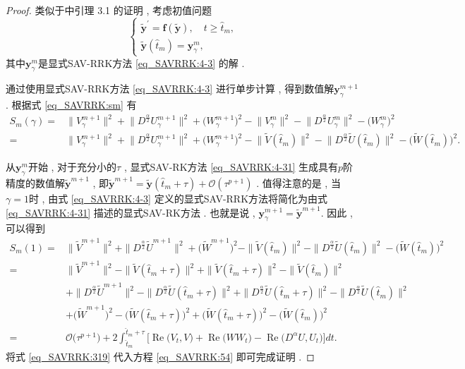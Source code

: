 \begin{proof}
类似于\citep{liImplicitexplicitRelaxationRungeKutta2022}中引理 3.1 的证明 , 
考虑初值问题
\begin{equation}
\left\{\begin{array}{l}
\tilde{\bm{y}}^{\prime}=\bm{f}(\tilde{\bm{y}}) , \quad t \geq \hat{t}_m , \\
\tilde{\bm{y}}\left(\hat{t}_m\right)=\bm{y}_\gamma^m , 
\end{array}\right . 
\end{equation}
其中$\bm{y}_\gamma^m$是显式SAV-RRK方法 \eqref{eq_SAVRRK:4-3} 的解 . 

通过使用显式SAV-RRK方法 \eqref{eq_SAVRRK:4-3} 进行单步计算 , 得到数值解$\bm{y}_\gamma^{m+1}$ . 根据式 \eqref{eq_SAVRRK:sm} 有
\begin{equation}
\begin{aligned}
S_m(\gamma) \!=& \|V_\gamma^{m+1}\|^2 \!+\! \|D^\frac{\alpha}{2} U_\gamma^{m+1}\|^2\!+\!\big(W_\gamma^{m+1}\big)^2\!-\!\|V_\gamma^{m}\|^2 \!-\! \|D^\frac{\alpha}{2} U_\gamma^{m}\|^2\!-\!\big(W_\gamma^{m}\big)^2\\
\!=& \|V_\gamma^{m+1}\|^2 \!+\! \|D^\frac{\alpha}{2} U_\gamma^{m+1}\|^2\!+\!\big(W_\gamma^{m+1}\big)^2\!-\!\|\tilde{V}(\hat{t}_{m})\|^2 \!-\! \|D^\frac{\alpha}{2} \tilde{U}(\hat{t}_{m})\|^2\!-\!\big(\tilde{W}(\hat{t}_{m})\big)^2 . 
\end{aligned}
\end{equation}

从$\bm{y}_\gamma^m$开始 , 对于充分小的$\tau$ , 显式SAV-RK方法 \eqref{eq_SAVRRK:4-31} 生成具有$p$阶精度的数值解$\tilde{\bm{y}}^{m+1}$ , 
即$\tilde{\bm{y}}^{m+1}=\tilde{\bm{y}}\left(\hat{t}_m+\tau\right)+\mathcal{O}\left(\tau^{p+1}\right)$ . 
值得注意的是 , 当$\gamma=1$时 , 由式 \eqref{eq_SAVRRK:4-3} 定义的显式SAV-RRK方法将简化为由式 \eqref{eq_SAVRRK:4-31} 描述的显式SAV-RK方法 . 也就是说 , $\bm{y}_\gamma^{m +1}=\tilde{\bm{y}}^{m +1} .$ 因此 , 可以得到
\begin{align}
S_m(1) = &\|\tilde{V}^{m+1}\|^2 + \|D^\frac{\alpha}{2} \tilde{U}^{m+1}\|^2+\big(\tilde{W}^{m+1}\big)^2-\|\tilde{V}(\hat{t}_{m})\|^2-\|D^\frac{\alpha}{2} \tilde{U}(\hat{t}_{m})\|^2-\big(\tilde{W}(\hat{t}_{m})\big)^2 \nonumber\\
= &\|\tilde{V}^{m+1}\|^2 -\|\tilde{V}(\hat{t}_{m}+\tau)\|^2 +\|\tilde{V}(\hat{t}_{m}+\tau)\|^2-\|\tilde{V}(\hat{t}_{m})\|^2\nonumber\\
& + \|D^\frac{\alpha}{2} \tilde{U}^{m+1}\|^2 -\|D^\frac{\alpha}{2} \tilde{U}(\hat{t}_{m}+\tau)\|^2+\|D^\frac{\alpha}{2} \tilde{U}(\hat{t}_{m}+\tau)\|^2- \|D^\frac{\alpha}{2} \tilde{U}(\hat{t}_{m})\|^2\nonumber\\
& +\big(\tilde{W}^{m+1}\big)^2 -\big(\tilde{W}(\hat{t}_{m}+\tau)\big)^2+\big(\tilde{W}(\hat{t}_{m}+\tau)\big)^2-\big(\tilde{W}(\hat{t}_{m})\big)^2 \nonumber\\
= &\mathcal{O}\big(\tau^{p+1}\big) +2\int_{\hat{t}_m}^{\hat{t}_m+\tau}\big[\operatorname{Re}\big(V_t , V\big) + \operatorname{Re}\big(W W_t\big)-\operatorname{Re}\big(D^{\alpha} U , U_t\big)\big]dt . \label{eq_SAVRRK:54}
\end{align}
将式 \eqref{eq_SAVRRK:319} 代入方程 \eqref{eq_SAVRRK:54} 即可完成证明 . 


\end{proof}
